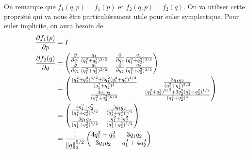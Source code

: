 On remarque que $f_1(q,p) = f_1(p)$ et $f_2(q,p) = f_2(q)$.
On va utiliser cette propriété qui va nous être particulièrement utile pour euler symplectique.
Pour euler implicite, on aura besoin de
\begin{align*}
  \frac{\partial f_1(p)}{\partial p} & = I\\
  \frac{\partial f_2(q)}{\partial q} & =
  \begin{pmatrix}
    \frac{\partial }{\partial q_1}\frac{q_1}{(q_1^2 + q_2^2)^{3/2}} &
    \frac{\partial }{\partial q_2}\frac{q_1}{(q_1^2 + q_2^2)^{3/2}}\\
    \frac{\partial }{\partial q_1}\frac{q_2}{(q_1^2 + q_2^2)^{3/2}} &
    \frac{\partial }{\partial q_2}\frac{q_2}{(q_1^2 + q_2^2)^{3/2}}
  \end{pmatrix}\\
  & =
  \begin{pmatrix}
    \frac{(q_1^2 + q_2^2)^{3/2} + 3q_1^2(q_1^2 + q_2^2)^{1/2}}{(q_1^2 + q_2^2)^3} &
    \frac{3q_1q_2}{(q_1^2 + q_2^2)^{5/2}}\\
    \frac{3q_1q_2}{(q_1^2 + q_2^2)^{5/2}} &
    \frac{(q_1^2 + q_2^2)^{3/2} + 3q_2^2(q_1^2 + q_2^2)^{1/2}}{(q_1^2 + q_2^2)^3}
  \end{pmatrix}\\
  & =
  \begin{pmatrix}
    \frac{4q_1^2 + q_2^2}{(q_1^2 + q_2^2)^{5/2}} &
    \frac{3q_1q_2}{(q_1^2 + q_2^2)^{5/2}}\\
    \frac{3q_1q_2}{(q_1^2 + q_2^2)^{5/2}} &
    \frac{q_1^2 + 4q_2^2}{(q_1^2 + q_2^2)^{5/2}}
  \end{pmatrix}\\
  & =
  \frac{1}{\|q\|_2^{5/2}}
  \begin{pmatrix}
    4q_1^2 + q_2^2 &
    3q_1q_2\\
    3q_1q_2 &
    q_1^2 + 4q_2^2
  \end{pmatrix}
\end{align*}

